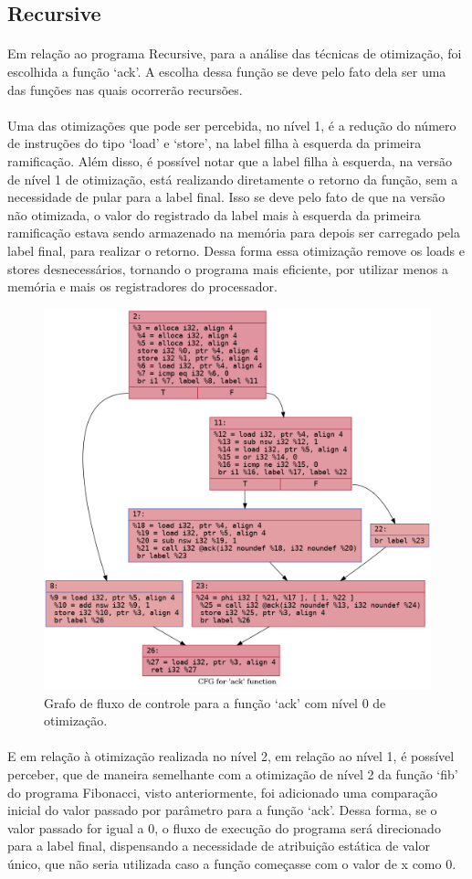 \documentclass[12pt]{article}
\begin{document}
\subsection{Recursive}

\paragraph{}Em relação ao programa Recursive, para a análise das técnicas de otimização, foi escolhida a função ‘ack’. A escolha dessa função se deve pelo fato dela ser uma das funções nas quais ocorrerão recursões.

\paragraph{}Uma das otimizações que pode ser percebida, no nível 1, é a redução do número de instruções do tipo ‘load’ e ‘store’, na label filha à esquerda da primeira ramificação. Além disso, é possível notar que a label filha à esquerda, na versão de nível 1 de otimização, está realizando diretamente o retorno da função, sem a necessidade de pular para a label final. Isso se deve pelo fato de que na versão não otimizada, o valor do registrado da label mais à esquerda da primeira ramificação estava sendo armazenado na memória para depois ser carregado pela label final, para realizar o retorno. Dessa forma essa otimização remove os loads e stores desnecessários, tornando o programa mais eficiente, por utilizar menos a memória e mais os registradores do processador.

\begin{figure}
    \centering
    \includegraphics[width=0.5\linewidth]{recursive_.ack_O0.png}
    \caption{Grafo de fluxo de controle para a função ‘ack’ com nível 0 de otimização.}
\end{figure}

\paragraph{}E em relação à otimização realizada no nível 2, em relação ao nível 1, é possível perceber, que de maneira semelhante com a otimização de nível 2 da função ‘fib’ do programa Fibonacci, visto anteriormente, foi adicionado uma comparação inicial do valor passado por parâmetro para a função ‘ack’. Dessa forma, se o valor passado for igual a 0, o fluxo de execução do programa será direcionado para a label final, dispensando a necessidade de atribuição estática de valor único, que não seria utilizada caso a função começasse com o valor de x como 0.
\end{document}
